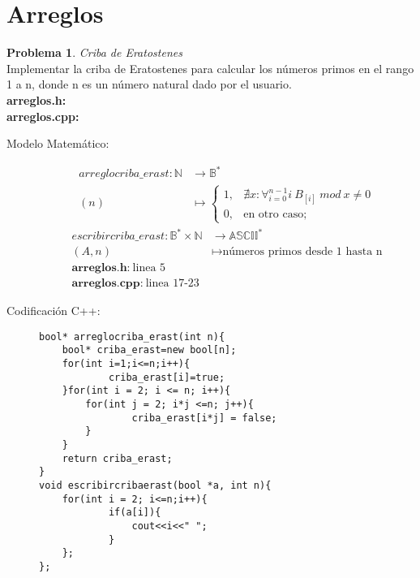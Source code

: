 \documentclass{article}
\theoremstyle{plain}
\theoremstyle{definition}
\newtheorem{problem}{Problema}
\begin{document}
\section{Arreglos}

\begin{problem} \emph{Criba de Eratostenes}\\
Implementar la criba de Eratostenes para calcular los números primos en el rango 1 a n, donde n es un número natural dado por el usuario.\\
\textbf{arreglos.h:}\ \\
\textbf{arreglos.cpp:}\ 
%
\begin{description}
\item[Modelo Matemático:]
%
\begin{align*}
arreglocriba\_erast: \mathbb{N} &\to \mathbb{B}^*\\ 
(n) &\mapsto 
\begin{cases}
1,& \text{$\nexists x:\forall_{i=0}^{n-1}i\ B_{[i]} \ mod\ x \neq 0$}\\
0,& \text{en otro caso;}
\end{cases}
\end{align*}
\begin{align*}
escribircriba\_erast: \mathbb{B}^*\times\mathbb{N} &\to \mathbb{ASCII}^*\\
(A,n)&\mapsto \text{números primos desde 1 hasta n}\\
\textbf{arreglos.h:}\ \text{linea 5}\\
\textbf{arreglos.cpp:}\ \text{linea 17-23}
\end{align*}
%
\item[Codificación \textsf{C++}:]\hfill
%
\begin{verbatim}
bool* arreglocriba_erast(int n){
    bool* criba_erast=new bool[n];
    for(int i=1;i<=n;i++){
            criba_erast[i]=true;
    }for(int i = 2; i <= n; i++){
        for(int j = 2; i*j <=n; j++){
                criba_erast[i*j] = false;
        }
    }
    return criba_erast;
}
void escribircribaerast(bool *a, int n){
    for(int i = 2; i<=n;i++){
            if(a[i]){
                cout<<i<<" ";
            }
    };
};
\end{verbatim}
\end{description}
\end{problem}
\end{document}
